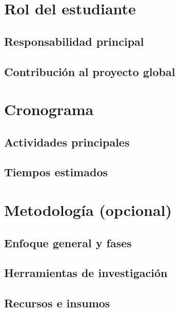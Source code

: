 \section{Rol del estudiante}
\subsection{Responsabilidad principal}
\subsection{Contribución al proyecto global}

\section{Cronograma}
\subsection{Actividades principales}
\subsection{Tiempos estimados}

\section{Metodología (opcional)}
\subsection{Enfoque general y fases}
\subsection{Herramientas de investigación}
\subsection{Recursos e insumos}

